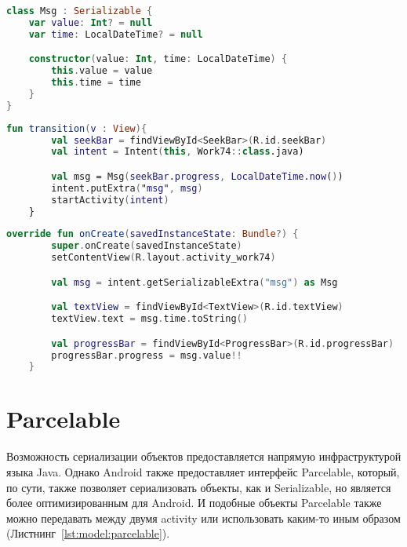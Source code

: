 \begin{lstlisting}[language=Kotlin, caption=\leftline{}, label=lst:serializable1]
class Msg : Serializable {
    var value: Int? = null
    var time: LocalDateTime? = null

    constructor(value: Int, time: LocalDateTime) {
        this.value = value
        this.time = time
    }
}
\end{lstlisting}

\begin{lstlisting}[language=Kotlin, caption=\leftline{}, label=lst:serializable2]
fun transition(v : View){
        val seekBar = findViewById<SeekBar>(R.id.seekBar)
        val intent = Intent(this, Work74::class.java)

        val msg = Msg(seekBar.progress, LocalDateTime.now())
        intent.putExtra("msg", msg)
        startActivity(intent)
    }
\end{lstlisting}

\begin{lstlisting}[language=Kotlin, caption=\leftline{}, label=lst:serializable3]
override fun onCreate(savedInstanceState: Bundle?) {
        super.onCreate(savedInstanceState)
        setContentView(R.layout.activity_work74)

        val msg = intent.getSerializableExtra("msg") as Msg

        val textView = findViewById<TextView>(R.id.textView)
        textView.text = msg.time.toString()

        val progressBar = findViewById<ProgressBar>(R.id.progressBar)
        progressBar.progress = msg.value!!
    }
\end{lstlisting}

\section{Parcelable}
Возможность сериализации объектов предоставляется напрямую
инфраструктурой языка Java. Однако Android также предоставляет
интерфейс Parcelable, который, по сути, также позволяет сериализовать
объекты, как и Serializable, но является более оптимизированным для
Android. И подобные объекты Parcelable также можно передавать между
двумя activity или использовать каким-то иным образом
(Листнинг~\ref{lst:model:parcelable}).

